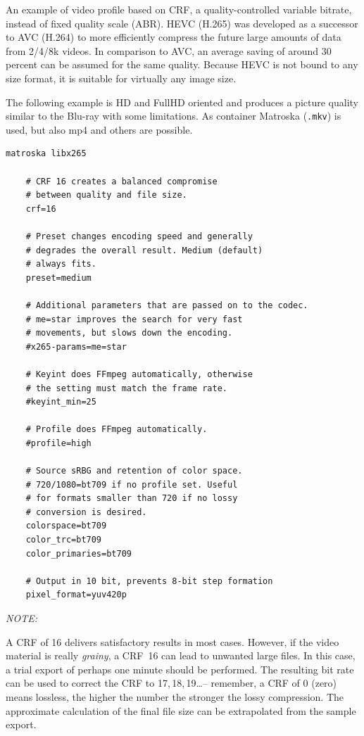 An example of video profile based on CRF, a quality-controlled
variable bitrate, instead of fixed quality scale (ABR).  HEVC
(H.265) was developed as a successor to AVC (H.264) to more
efficiently compress the future large amounts of data from 2/4/8k
videos.  In comparison to AVC, an average saving of around 30
percent can be assumed for the same quality.  Because HEVC is not
bound to any size format, it is suitable for virtually any image
size.

The following example is HD and FullHD oriented and produces a
picture quality similar to the Blu-ray with some limitations.  As
container Matroska (\texttt{.mkv}) is used, but also mp4 and others
are possible.

\begin{lstlisting}[style=sh]
	matroska libx265
	
	# CRF 16 creates a balanced compromise
	# between quality and file size.
	crf=16
	
	# Preset changes encoding speed and generally
	# degrades the overall result. Medium (default)
	# always fits.
	preset=medium
	
	# Additional parameters that are passed on to the codec.
	# me=star improves the search for very fast
	# movements, but slows down the encoding.
	#x265-params=me=star
	
	# Keyint does FFmpeg automatically, otherwise
	# the setting must match the frame rate.
	#keyint_min=25
	
	# Profile does FFmpeg automatically.
	#profile=high
	
	# Source sRBG and retention of color space.
	# 720/1080=bt709 if no profile set. Useful
	# for formats smaller than 720 if no lossy
	# conversion is desired.
	colorspace=bt709
	color_trc=bt709
	color_primaries=bt709
	
	# Output in 10 bit, prevents 8-bit step formation
	pixel_format=yuv420p
\end{lstlisting}

\noindent \textit{NOTE:}

A CRF of 16 delivers satisfactory results in most cases. However, if
the video material is really \emph{grainy}, a CRF~16 can lead to
unwanted large files.  In this case, a trial export of perhaps one
minute should be performed. The resulting bit rate can be used to
correct the CRF to 17,\,18,\,19\ldots -- remember, a CRF of $0$ (zero)
means lossless, the higher the number the stronger the lossy
compression. The approximate calculation of the final file size can
be extrapolated from the sample export.

